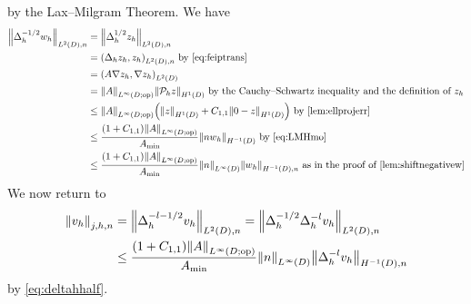 \beq\label{eq:LMHmo}
 \leq {} 
\eeq
by the Lax--Milgram Theorem. We have
\begin{align}
\NLtDn{\Deltah^{-1/2}\wh} &= \NLtDn{\Deltah^{1/2} \zh}\nonumber\\
&= \IPLtDn{\Deltah \zh}{\zh} \text{ by \cref{eq:feiptrans}}\\
&= \IPLtD{A \grad \zh}{\grad \zh}\nonumber\\
&= \NLiDop{A} \NHoD{\Ph z}\nonumber\text{ by the Cauchy--Schwartz inequality and the definition of } \zh\\
&\leq \NLiDop{A}\mleft(\NHoD{z} + \Cfn{1,1}\NHoD{0 - z}\mright) \text{ by \cref{lem:ellprojerr}}\nonumber\\
&\leq \frac{\mleft(1+\Cfn{1,1}\mright)\NLiDop{A}}{\Amin}  \NHmoD{n\wh}\text{ by \cref{eq:LMHmo}}\label{eq:deltahhalf}\\
&\leq \frac{\mleft(1+\Cfn{1,1}\mright)\NLiDop{A}}{\Amin}\NLiD{n}  \NHnfn{-1}{D}{\wh}\text{ as in the proof of \cref{lem:shiftnegativew}}\nonumber
\end{align}
We now return to
\begin{align*}
\Nfn{j,h,n}{\vh} &= \NLtDn{\Deltah^{-l-1/2} \vh} = \NLtDn{\Deltah^{-1/2} \Deltah^{-l} \vh}\\
&\leq \frac{\mleft(1+\Cfn{1,1}\mright)\NLiDop{A}}{\Amin}\NLiD{n}\NHnfn{-1}{D}{\Deltah^{-l}\vh}
\end{align*}
by \cref{eq:deltahhalf}.

